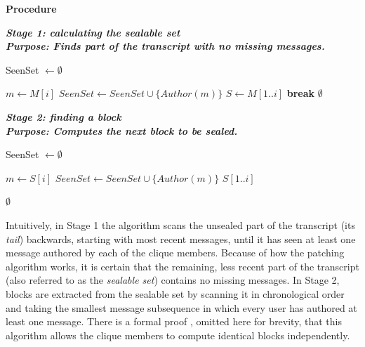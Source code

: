 \documentclass[a4paper, twoside, 12pt]{report}
\begin{document}
\begin{algorithm}
\textbf{Procedure}
\vspace{3mm}
\begin{algorithmic}
    \STATE \textbf{\textit{Stage 1: calculating the sealable set \\ \vspace{2mm} Purpose: Finds part of the transcript with no missing messages. \vspace{3mm}}}
    \STATE
    \begin{enumerate}
            \STATE SeenSet $\leftarrow \emptyset$
            \begin{spacing}{1.2}
                \STATE $m \leftarrow M[i]$
                \STATE $SeenSet \leftarrow SeenSet \cup \{Author(m)\}$
                    \STATE $S \leftarrow M[1..i]$
                    \STATE \textbf{break}
                \ENDIF
            \ENDFOR
                \RETURN $\emptyset$
            \ENDIF
            \end{spacing}    
    \end{enumerate}
    \STATE \textbf{\textit{Stage 2: finding a block \\ \vspace{2mm} Purpose: Computes the next block to be sealed. \vspace{3mm}}}
    \begin{enumerate} \setcounter{enumi}{3}
        \STATE SeenSet $\leftarrow \emptyset$
        \begin{spacing}{1.2}
            \STATE $m \leftarrow S[i]$
            \STATE $SeenSet \leftarrow SeenSet \cup \{Author(m)\}$
                \RETURN $S[1..i]$
            \ENDIF
        \ENDFOR
        \end{spacing}
        \vspace{-2mm}
        \RETURN $\emptyset$
    \end{enumerate}

\end{algorithmic}
\end{algorithm}

Intuitively, in Stage 1 the algorithm scans the unsealed part of the transcript (its \emph{tail}) backwards, starting with most recent messages, until it has seen at least one message authored by each of the clique members. Because of how the patching algorithm works, it is certain that the remaining, less recent part of the transcript (also referred to as the \emph{sealable set}) contains no missing messages. In Stage 2, blocks are extracted from the sealable set by scanning it in chronological order and taking the smallest message subsequence in which every user has authored at least one message. There is a formal proof \cite{reardon2007kleeq}, omitted here for brevity, that this algorithm allows the clique members to compute identical blocks independently. \\
\end{document}
